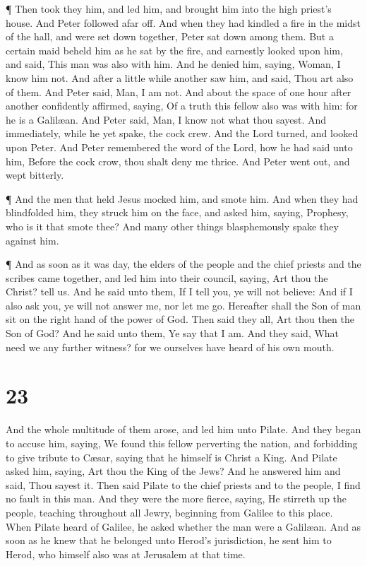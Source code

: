  ¶ Then took they him, and led him, and brought him into
the high priest's house. And Peter followed afar off.  And
when they had kindled a fire in the midst of the hall, and were set down
together, Peter sat down among them.  But a certain maid
beheld him as he sat by the fire, and earnestly looked upon him, and
said, This man was also with him.  And he denied him,
saying, Woman, I know him not.  And after a little while
another saw him, and said, Thou art also of them. And Peter said, Man, I
am not.  And about the space of one hour after another
confidently affirmed, saying, Of a truth this fellow also was with him:
for he is a Galilæan.  And Peter said, Man, I know not what
thou sayest. And immediately, while he yet spake, the cock crew.
 And the Lord turned, and looked upon Peter. And Peter
remembered the word of the Lord, how he had said unto him, Before the
cock crow, thou shalt deny me thrice.  And Peter went out,
and wept bitterly.

 ¶ And the men that held Jesus mocked him, and smote him.
 And when they had blindfolded him, they struck him on the
face, and asked him, saying, Prophesy, who is it that smote thee?
 And many other things blasphemously spake they against
him.

 ¶ And as soon as it was day, the elders of the people and
the chief priests and the scribes came together, and led him into their
council, saying,  Art thou the Christ? tell us. And he said
unto them, If I tell you, ye will not believe:  And if I
also ask you, ye will not answer me, nor let me go. 
Hereafter shall the Son of man sit on the right hand of the power of
God.  Then said they all, Art thou then the Son of God? And
he said unto them, Ye say that I am.  And they said, What
need we any further witness? for we ourselves have heard of his own
mouth.

\hypertarget{section-22}{%
\section{23}\label{section-22}}

 And the whole multitude of them arose, and led him unto
Pilate.  And they began to accuse him, saying, We found this
fellow perverting the nation, and forbidding to give tribute to Cæsar,
saying that he himself is Christ a King.  And Pilate asked
him, saying, Art thou the King of the Jews? And he answered him and
said, Thou sayest it.  Then said Pilate to the chief priests
and to the people, I find no fault in this man.  And they
were the more fierce, saying, He stirreth up the people, teaching
throughout all Jewry, beginning from Galilee to this place. 
When Pilate heard of Galilee, he asked whether the man were a Galilæan.
 And as soon as he knew that he belonged unto Herod's
jurisdiction, he sent him to Herod, who himself also was at Jerusalem at
that time.

